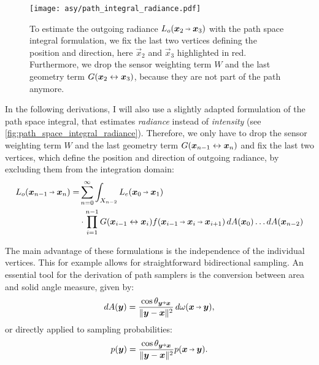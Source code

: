 \begin{figure}[ht]
    \centering
    \texttt{[image: asy/path\_integral\_radiance.pdf]}
\caption{To estimate the outgoing radiance $L_o(\pdir{2}{3})$ with the path space integral formulation, we fix the last two vertices defining the position and direction, here $\vec{x}_2$ and $\vec{x}_3$ highlighted in red. Furthermore, we drop the sensor weighting term $W$ and the last geometry term $G(\bm{x}_{2} \leftrightarrow \bm{x}_{3})$, because they are not part of the path anymore.}
\label{fig:path_space_integral_radiance}
\end{figure}
In the following derivations, I will also use a slightly adapted formulation of the path space integral, that estimates \emph{radiance} instead of \emph{intensity} (see \autoref{fig:path_space_integral_radiance}).
Therefore, we only have to drop the sensor weighting term $W$ and the last geometry term $G(\bm{x}_{n-1} \leftrightarrow \bm{x}_{n})$ and fix the last two vertices, which define the position and direction of outgoing radiance, by excluding them from the integration domain:
\begin{equation}
\label{eq:path_space_integral_radiance}
\begin{aligned}
    L_o(\pdir{n-1}{n})
    = &\sum_{n=0}^{\infty} \int_{X_{n-2}} L_e(\pdir{0}{1}) \\
    &\cdot \prod_{i=1}^{n - 1} \G{i-1}{i} \f{i-1}{i}{i+1} 
    \diff A(\vec{x}_0) \dots \diff A(\vec{x}_{n-2})
\end{aligned}
\end{equation}

The main advantage of these formulations is the independence of the individual vertices.
This for example allows for straightforward bidirectional sampling.
An essential tool for the derivation of path samplers is the conversion between area and solid angle measure, given by:
\begin{equation}
\label{eq:area_solid_angle}
\diff A(\vec{y}) = \frac{\cos \theta_{\vec{y}\veryshortarrow\vec{x}}}{\|\vec{y} - \vec{x}\|^2} \diff \omega(\vec{x}\pto\vec{y}),
\end{equation}
or directly applied to sampling probabilities:
\begin{equation}
\label{eq:area_solid_angle_p}
p(\vec{y}) = \frac{\cos \theta_{\vec{y}\veryshortarrow\vec{x}}}{\|\vec{y} - \vec{x}\|^2} p(\vec{x}\pto\vec{y}).
\end{equation}

